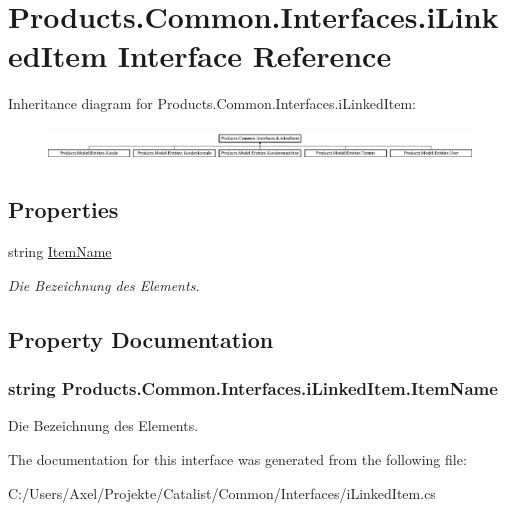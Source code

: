 \hypertarget{interface_products_1_1_common_1_1_interfaces_1_1i_linked_item}{}\section{Products.\+Common.\+Interfaces.\+i\+Linked\+Item Interface Reference}
\label{interface_products_1_1_common_1_1_interfaces_1_1i_linked_item}
Inheritance diagram for Products.\+Common.\+Interfaces.\+i\+Linked\+Item\+:\begin{figure}[H]
\begin{center}
\leavevmode
\includegraphics[height=0.885375cm]{interface_products_1_1_common_1_1_interfaces_1_1i_linked_item}
\end{center}
\end{figure}
\subsection*{Properties}
\begin{DoxyCompactItemize}
\item 
string \hyperlink{interface_products_1_1_common_1_1_interfaces_1_1i_linked_item_a596217dd8e37fbc1f1cd726a5b640d84}{Item\+Name}
\begin{DoxyCompactList}\small\item\em Die Bezeichnung des Elements. \end{DoxyCompactList}\end{DoxyCompactItemize}


\subsection{Property Documentation}
\subsubsection[{\texorpdfstring{Item\+Name}{ItemName}}]{\setlength{\rightskip}{0pt plus 5cm}string Products.\+Common.\+Interfaces.\+i\+Linked\+Item.\+Item\+Name\hspace{0.3cm}{\ttfamily [get]}}\hypertarget{interface_products_1_1_common_1_1_interfaces_1_1i_linked_item_a596217dd8e37fbc1f1cd726a5b640d84}{}\label{interface_products_1_1_common_1_1_interfaces_1_1i_linked_item_a596217dd8e37fbc1f1cd726a5b640d84}


Die Bezeichnung des Elements. 



The documentation for this interface was generated from the following file\+:\begin{DoxyCompactItemize}
\item 
C\+:/\+Users/\+Axel/\+Projekte/\+Catalist/\+Common/\+Interfaces/i\+Linked\+Item.\+cs\end{DoxyCompactItemize}
